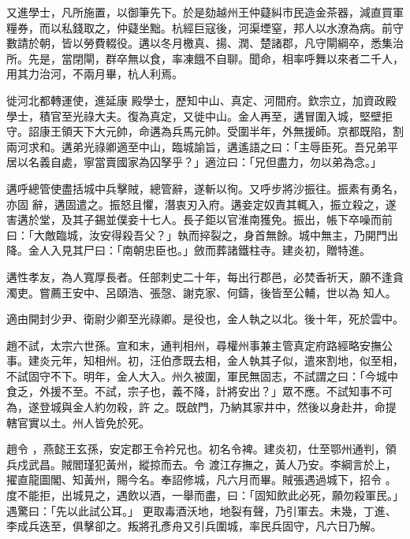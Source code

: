 \begin{pinyinscope}
 又進學士，凡所施置，以御筆先下。於是劾越州王仲薿糾市民造金茶器，減直買軍糧券，而以私錢取之，仲薿坐黜。杭經巨寇後，河渠堙窒，邦人以水潦為病。前守數請於朝，皆以勞費輟役。遘以冬月檄真、揚、潤、楚諸郡，凡守閘綱卒，悉集治所。先是，當閉閘，群卒無以食，率凍餓不自聊。聞命，相率呼舞以來者二千人，用其力治河，不兩月畢，杭人利焉。



 徙河北都轉運使，進延康
 殿學士，歷知中山、真定、河間府。欽宗立，加資政殿學士，積官至光祿大夫。復為真定，又徙中山。金人再至，遘冒圍入城，堅壁拒守。詔康王領天下大元帥，命遘為兵馬元帥。受圍半年，外無援師。京都既陷，割兩河求和。遘弟光祿卿適至中山，臨城諭旨，遘遙語之曰：「主辱臣死。吾兄弟平居以名義自處，寧當賣國家為囚孥乎？」適泣曰：「兄但盡力，勿以弟為念。」



 遘呼總管使盡括城中兵擊賊，總管辭，遂斬以徇。又呼步將沙振往。振素有勇名，亦固
 辭，遘固遣之。振怒且懼，潛衷刃入府。遘妾定奴責其輒入，振立殺之，遂害遘於堂，及其子錫並僕妾十七人。長子鉅以官淮南獲免。振出，帳下卒噪而前曰：「大敵臨城，汝安得殺吾父？」執而捽裂之，身首無餘。城中無主，乃開門出降。金人入見其尸曰：「南朝忠臣也。」斂而葬諸鐵柱寺。建炎初，贈特進。



 遘性孝友，為人寬厚長者。任部刺史二十年，每出行郡邑，必焚香祈天，願不逢貪濁吏。嘗薦王安中、呂頤浩、張愨、謝克家、何鑄，後皆至公輔，世以為
 知人。



 適由開封少尹、衛尉少卿至光祿卿。是役也，金人執之以北。後十年，死於雲中。



 趙不試，太宗六世孫。宣和末，通判相州，尋權州事兼主管真定府路經略安撫公事。建炎元年，知相州。初，汪伯彥既去相，金人執其子似，遣來割地，似至相，不試固守不下。明年，金人大入。州久被圍，軍民無固志，不試謂之曰：「今城中食乏，外援不至。不試，宗子也，義不降，計將安出？」眾不應。不試知事不可為，遂登城與金人約勿殺，許
 之。既啟門，乃納其家井中，然後以身赴井，命提轄官實以土。州人皆免於死。


趙令
 ，燕懿王玄孫，安定郡王令衿兄也。初名令裨。建炎初，仕至鄂州通判，領兵戍武昌。賊閻瑾犯黃州，縱掠而去。令
 渡江存撫之，黃人乃安。李綱言於上，擢直龍圖閣、知黃州，賜今名。奉詔修城，凡六月而畢。賊張遇過城下，招令
 。度不能拒，出城見之，遇飲以酒，一舉而盡，曰：「固知飲此必死，願勿殺軍民。」遇驚曰：「先以此試公耳。」
 更取毒酒沃地，地裂有聲，乃引軍去。未幾，丁進、李成兵迭至，俱擊卻之。叛將孔彥舟又引兵圍城，率民兵固守，凡六日乃解。



\end{pinyinscope}
